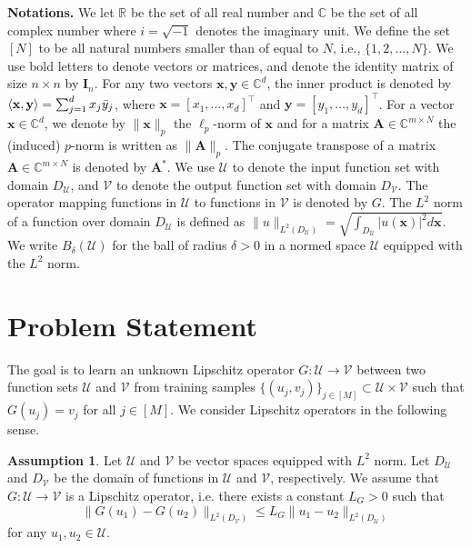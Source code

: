 \documentclass[11pt,twoside]{article}
\theoremstyle{plain}
\theoremstyle{definition}
\newtheorem{assumption}{Assumption}
\theoremstyle{remark}
\newcommand{\R}{\mathbb{R}}
\newcommand{\C}{\mathbb{C}}
\newcommand{\Ab}{\mathbf{A}}
\newcommand{\Ib}{\mathbf{I}}
\newcommand{\xb}{\mathbf{x}}
\newcommand{\yb}{\mathbf{y}}
\newcommand{\Uc}{\mathcal{U}}
\newcommand{\Vc}{\mathcal{V}}
\begin{document}
{\bf Notations.} We let $\R$ be the set of all real number and $\C$ be the set of all complex number where $i=\sqrt{-1}$ denotes the imaginary unit. We define the set $[N]$ to be all natural numbers smaller than of equal to $N$, i.e., $\{1,2,\dots,N\}$. 
We use bold letters to denote vectors or matrices, and denote the identity matrix of size $n\times n$ by $\Ib_n$. 
For any two vectors $\xb,\yb\in\C^d$, the inner product is denoted by $\langle \xb,\yb\rangle = \sum_{j=1}^d x_j\Bar{y}_j$, where $\xb = [x_1,\dots,x_d]^\top$ and $\yb = [y_1,\dots,y_d]^\top$. For a vector $\xb\in\C^d$, we denote by $\|\xb\|_p$ the $\ell_p$-norm of $\xb$ and for a matrix $\Ab\in\C^{m\times N}$ the (induced) $p$-norm is written as $\|\Ab\|_p$. 
The conjugate transpose of a matrix $\Ab\in\C^{m\times N}$ is denoted by $\Ab^*$. 
We use $\Uc$ to denote the input function set with domain $D_\Uc$, and $\Vc$ to denote the output function set with domain $D_\Vc$. The operator mapping functions in $\Uc$ to functions in $\Vc$ is denoted by $G$. The $L^2$ norm of a function over domain $D_\Uc$ is defined as $\|u\|_{L^2(D_\Uc)} = \sqrt{\int_{D_\Uc} |u(\xb)|^2 d\xb}$. We write $B_\delta(\Uc)$ for the ball of radius $\delta>0$ in a normed space $\Uc$ equipped with the $L^2$ norm.

\section{Problem Statement}
\label{Sec:framework}
The goal is to learn an unknown Lipschitz operator $G:\Uc\to\Vc$ between two function sets $\Uc$ and $\Vc$ from training samples $\{(u_j, v_j)\}_{j\in[M]} \subset \Uc\times\Vc$ such that $G(u_j)=v_j$ for all $j\in[M]$. We consider Lipschitz operators in the following sense.
\begin{assumption}
\label{Assmps:Lipschitz_G}
Let $\Uc$ and $\Vc$ be vector spaces equipped with $L^2$ norm.
Let $D_\Uc$ and $D_\Vc$ be the domain of functions in $\Uc$ and $\Vc$, respectively. 
We assume that $G:\Uc\to\Vc$ is a Lipschitz operator, i.e. there exists a constant $L_G>0$ such that
\begin{equation*}
\|G(u_1) - G(u_2)\|_{L^2(D_\Vc)} \leq L_G \|u_1 - u_2\|_{L^2(D_\Uc)}
\end{equation*}
for any $u_1,u_2\in\Uc$.
\end{assumption}
\end{document}
